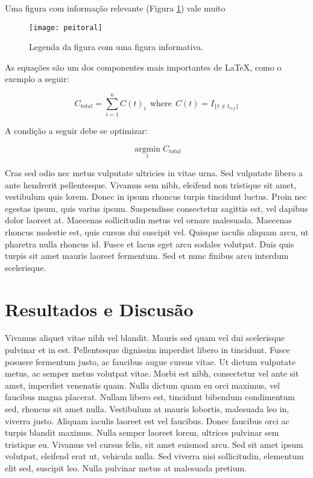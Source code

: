 Uma figura com informação relevante (Figura \ref{fig:peitoral}) vale muito

\begin{figure}
\centering
\texttt{[image: peitoral]}
\caption{Legenda da figura com uma figura informativa.}
\label{fig:peitoral}
\end{figure}


As equações são um dos componentes mais importantes de \LaTeX, como o exemplo a seguir:

\begin{equation}
C_{total} = \sum_{i = 1}^{n} C(t)_{i} \ \ \textrm{where} \ \ C(t) = I_{\{t \neq t_{\textit{ref}}\}}
\end{equation}

A condição a seguir debe se optimizar: 

\begin{equation}
\operatorname*{argmin}_t C_{total}
\end{equation}


Cras sed odio nec metus vulputate ultricies in vitae urna. Sed vulputate libero a ante hendrerit pellentesque. Vivamus sem nibh, eleifend non tristique sit amet, vestibulum quis lorem. Donec in ipsum rhoncus turpis tincidunt luctus. Proin nec egestas ipsum, quis varius ipsum. Suspendisse consectetur sagittis est, vel dapibus dolor laoreet at. Maecenas sollicitudin metus vel ornare malesuada. Maecenas rhoncus molestie est, quis cursus dui suscipit vel. Quisque iaculis aliquam arcu, ut pharetra nulla rhoncus id. Fusce et lacus eget arcu sodales volutpat. Duis quis turpis sit amet mauris laoreet fermentum. Sed et nunc finibus arcu interdum scelerisque.

\section{Resultados e Discusão}

Vivamus aliquet vitae nibh vel blandit. Mauris sed quam vel dui scelerisque pulvinar et in est. Pellentesque dignissim imperdiet libero in tincidunt. Fusce posuere fermentum justo, ac faucibus augue cursus vitae. Ut dictum vulputate metus, ac semper metus volutpat vitae. Morbi est nibh, consectetur vel ante sit amet, imperdiet venenatis quam. Nulla dictum quam eu orci maximus, vel faucibus magna placerat. Nullam libero est, tincidunt bibendum condimentum sed, rhoncus sit amet nulla. Vestibulum at mauris lobortis, malesuada leo in, viverra justo. Aliquam iaculis laoreet est vel faucibus. Donec faucibus orci ac turpis blandit maximus. Nulla semper laoreet lorem, ultrices pulvinar sem tristique eu. Vivamus vel cursus felis, sit amet euismod arcu. Sed sit amet ipsum volutpat, eleifend erat ut, vehicula nulla. Sed viverra nisi sollicitudin, elementum elit sed, suscipit leo. Nulla pulvinar metus at malesuada pretium. 

